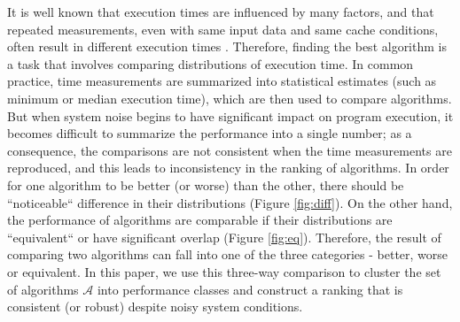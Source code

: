 \documentclass[conference]{IEEEtran}
\newcommand{\ar}[1]{{\color{red}#1}}
\begin{document}
It is well known that execution times are influenced by many factors, and that repeated measurements, even with same input data and same cache conditions, often result in different execution times\cite{peise2014cache} \cite{hoefler2010characterizing} \cite{peise2012performance}. Therefore, finding the best algorithm is a task that involves comparing distributions of execution time.
%
In common practice, time measurements are summarized into statistical estimates (such as minimum or median execution time), which are then used to compare algorithms\cite{peise2019elaps}. \ar{But when system noise begins to have significant impact on program execution, it becomes difficult to summarize the performance into a single number; as a consequence, the comparisons are not consistent when the time measurements are reproduced, and this leads to inconsistency in the ranking of algorithms.}
In order for one algorithm to be better (or worse) than the other, there should be ``noticeable`` difference in their distributions (Figure \ref{fig:diff}). On the other hand, the performance of algorithms are comparable if their distributions are ``equivalent`` or have significant overlap (Figure \ref{fig:eq}). 
%
Therefore, the result of comparing two algorithms can fall into one of the three categories - better, worse or equivalent. 
%
%
\ar{In this paper, we use this three-way comparison to cluster the set of algorithms $\mathcal{A}$ into performance classes and construct a ranking that is consistent (or robust) despite noisy system conditions.} 
%
\end{document}
